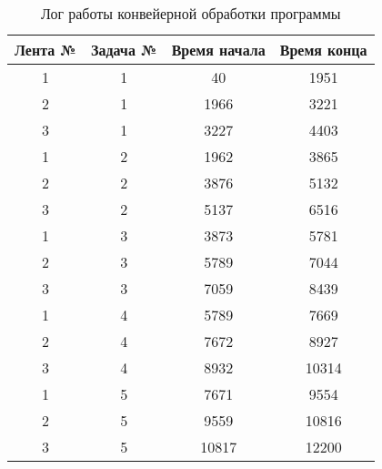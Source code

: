 \begin{table}[H]
    \caption{\centering Лог работы конвейерной обработки программы}
    \centering
    \begin{tabular}{|c|c|c|c|}
    \hline
    \multicolumn{1}{|l|}{Лента №} & \multicolumn{1}{l|}{Задача №} & \multicolumn{1}{l|}{Время начала} & \multicolumn{1}{l|}{Время конца} \\ \hline
    1                             & 1                             & 40                                & 1951                             \\ \hline
    2                             & 1                             & 1966                              & 3221                             \\ \hline
    3                             & 1                             & 3227                              & 4403                             \\ \hline
    1                             & 2                             & 1962                              & 3865                             \\ \hline
    2                             & 2                             & 3876                              & 5132                             \\ \hline
    3                             & 2                             & 5137                              & 6516                             \\ \hline
    1                             & 3                             & 3873                              & 5781                             \\ \hline
    2                             & 3                             & 5789                              & 7044                             \\ \hline
    3                             & 3                             & 7059                              & 8439                             \\ \hline
    1                             & 4                             & 5789                              & 7669                             \\ \hline
    2                             & 4                             & 7672                              & 8927                             \\ \hline
    3                             & 4                             & 8932                              & 10314                            \\ \hline
    1                             & 5                             & 7671                              & 9554                             \\ \hline
    2                             & 5                             & 9559                              & 10816                            \\ \hline
    3                             & 5                             & 10817                             & 12200                            \\ \hline
    \end{tabular}
    \label{tab:time}
\end{table}


